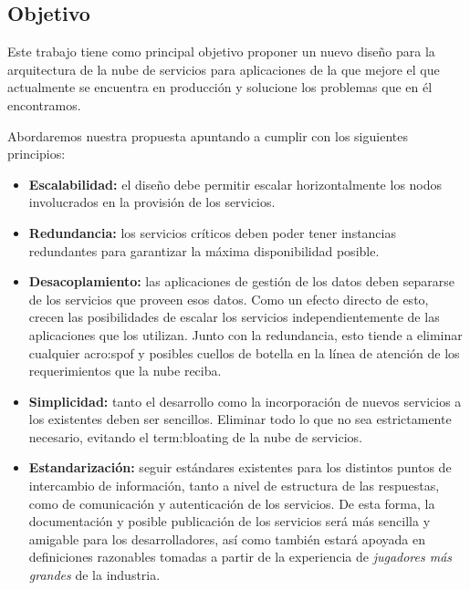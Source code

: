 \subsection{Objetivo}
\label{objetivo}

Este trabajo tiene como principal objetivo proponer un nuevo diseño para la arquitectura de la nube de servicios para aplicaciones de la {\unlp} que mejore el que actualmente se encuentra en producción y solucione los problemas que en él encontramos.

Abordaremos nuestra propuesta apuntando a cumplir con los siguientes principios:

\begin{itemize}
  \item \textbf{Escalabilidad:} el diseño debe permitir escalar horizontalmente los nodos involucrados en la provisión de los servicios.

  \item \textbf{Redundancia:} los servicios críticos deben poder tener instancias redundantes para garantizar la máxima disponibilidad posible.

  \item \textbf{Desacoplamiento:} las aplicaciones de gestión de los datos deben separarse de los servicios que proveen esos datos. Como un efecto directo de esto, crecen las posibilidades de escalar los servicios independientemente de las aplicaciones que los utilizan. Junto con la redundancia, esto tiende a eliminar cualquier \gls{acro:spof} y posibles cuellos de botella en la línea de atención de los requerimientos que la nube reciba.

  \item \textbf{Simplicidad:} tanto el desarrollo como la incorporación de nuevos servicios a los existentes deben ser sencillos. Eliminar todo lo que no sea estrictamente necesario, evitando el \gls{term:bloating} de la nube de servicios.

  \item \textbf{Estandarización:} seguir estándares existentes para los distintos puntos de intercambio de información, tanto a nivel de estructura de las respuestas, como de comunicación y autenticación de los servicios. De esta forma, la documentación y posible publicación de los servicios será más sencilla y amigable para los desarrolladores, así como también estará apoyada en definiciones razonables tomadas a partir de la experiencia de \textit{jugadores más grandes} de la industria.
\end{itemize}
